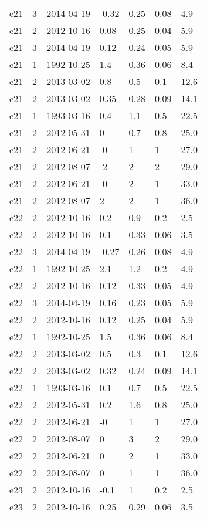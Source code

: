 \begin{table*}[htp]
\begin{tabular}{llll}
e21 & 3 & 2014-04-19 & -0.32 & 0.25 & 0.08 & 4.9 \\
e21 & 2 & 2012-10-16 & 0.08 & 0.25 & 0.04 & 5.9 \\
e21 & 3 & 2014-04-19 & 0.12 & 0.24 & 0.05 & 5.9 \\
e21 & 1 & 1992-10-25 & 1.4 & 0.36 & 0.06 & 8.4 \\
e21 & 2 & 2013-03-02 & 0.8 & 0.5 & 0.1 & 12.6 \\
e21 & 2 & 2013-03-02 & 0.35 & 0.28 & 0.09 & 14.1 \\
e21 & 1 & 1993-03-16 & 0.4 & 1.1 & 0.5 & 22.5 \\
e21 & 2 & 2012-05-31 & 0 & 0.7 & 0.8 & 25.0 \\
e21 & 2 & 2012-06-21 & -0 & 1 & 1 & 27.0 \\
e21 & 2 & 2012-08-07 & -2 & 2 & 2 & 29.0 \\
e21 & 2 & 2012-06-21 & -0 & 2 & 1 & 33.0 \\
e21 & 2 & 2012-08-07 & 2 & 2 & 1 & 36.0 \\
e22 & 2 & 2012-10-16 & 0.2 & 0.9 & 0.2 & 2.5 \\
e22 & 2 & 2012-10-16 & 0.1 & 0.33 & 0.06 & 3.5 \\
e22 & 3 & 2014-04-19 & -0.27 & 0.26 & 0.08 & 4.9 \\
e22 & 1 & 1992-10-25 & 2.1 & 1.2 & 0.2 & 4.9 \\
e22 & 2 & 2012-10-16 & 0.12 & 0.33 & 0.05 & 4.9 \\
e22 & 3 & 2014-04-19 & 0.16 & 0.23 & 0.05 & 5.9 \\
e22 & 2 & 2012-10-16 & 0.12 & 0.25 & 0.04 & 5.9 \\
e22 & 1 & 1992-10-25 & 1.5 & 0.36 & 0.06 & 8.4 \\
e22 & 2 & 2013-03-02 & 0.5 & 0.3 & 0.1 & 12.6 \\
e22 & 2 & 2013-03-02 & 0.32 & 0.24 & 0.09 & 14.1 \\
e22 & 1 & 1993-03-16 & 0.1 & 0.7 & 0.5 & 22.5 \\
e22 & 2 & 2012-05-31 & 0.2 & 1.6 & 0.8 & 25.0 \\
e22 & 2 & 2012-06-21 & -0 & 1 & 1 & 27.0 \\
e22 & 2 & 2012-08-07 & 0 & 3 & 2 & 29.0 \\
e22 & 2 & 2012-06-21 & 0 & 2 & 1 & 33.0 \\
e22 & 2 & 2012-08-07 & 0 & 1 & 1 & 36.0 \\
e23 & 2 & 2012-10-16 & -0.1 & 1 & 0.2 & 2.5 \\
e23 & 2 & 2012-10-16 & 0.25 & 0.29 & 0.06 & 3.5 \\

\end{tabular}
\end{table*}
